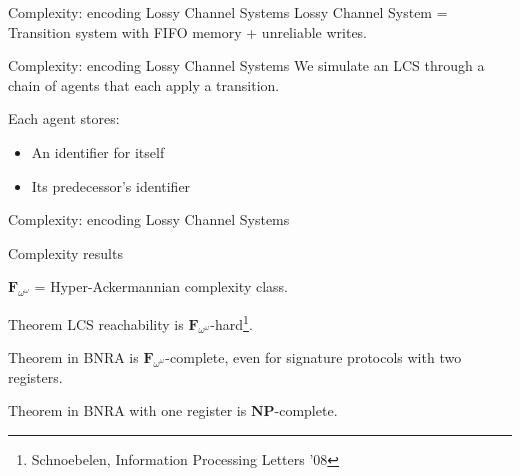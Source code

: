 \documentclass{beamer}
\begin{document}
\appendix
 \begin{frame}
  
 \end{frame}
\begin{frame}{Complexity: encoding Lossy Channel Systems}
	Lossy Channel System = Transition system with FIFO memory + unreliable writes.\vspace{1cm}
	
	
\end{frame}


\begin{frame}{Complexity: encoding Lossy Channel Systems}
	We simulate an LCS through a chain of agents that each apply a transition.
	
	Each agent stores:
	\begin{itemize}
		\item An identifier for itself
		
		\item Its predecessor's identifier
	\end{itemize} 
	
	
	
\end{frame}

\begin{frame}{Complexity: encoding Lossy Channel Systems}
	
	
	
\end{frame}

\begin{frame}{Complexity results}
	
	$\mathbf{F}_{\omega^\omega}$ = Hyper-Ackermannian complexity class.
	
	\begin{block}{Theorem}
		LCS reachability is $\mathbf{F}_{\omega^\omega}$-hard\footnote{Schnoebelen, Information Processing Letters '08}.
	\end{block}
	\pause 

	\begin{block}{Theorem}
		{} in BNRA is $\mathbf{F}_{\omega^\omega}$-complete, even for signature protocols with two registers.
	\end{block}
	\pause 

	\begin{block}{Theorem}
		 {} in BNRA with one register is $\mathbf{NP}$-complete.
	\end{block}
	
\end{frame}
\end{document}
